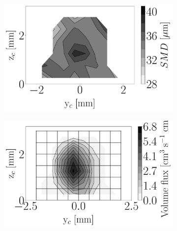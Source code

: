 \begin{figure}[h!]
\centering
\begin{subfigure}[b]{0.3\textwidth}
	\centering
   \includegraphics[scale=\scaleSLIBIMER]{./part3_applications/figures_ch8_resolved/injectors_SLI/dx10_xD06p67_SMD_map}
\end{subfigure}
   \hspace{0.17in}
\begin{subfigure}[b]{0.3\textwidth}
	\centering
   \includegraphics[scale=\scaleSLIBIMER]{./part3_applications/figures_ch8_resolved/injectors_SLI/dx10_xD06p67_volume_flux_map}
\end{subfigure}
   \hspace{0.17in}
\begin{subfigure}[b]{0.3\textwidth}
	\centering

\end{subfigure}
\end{figure}
